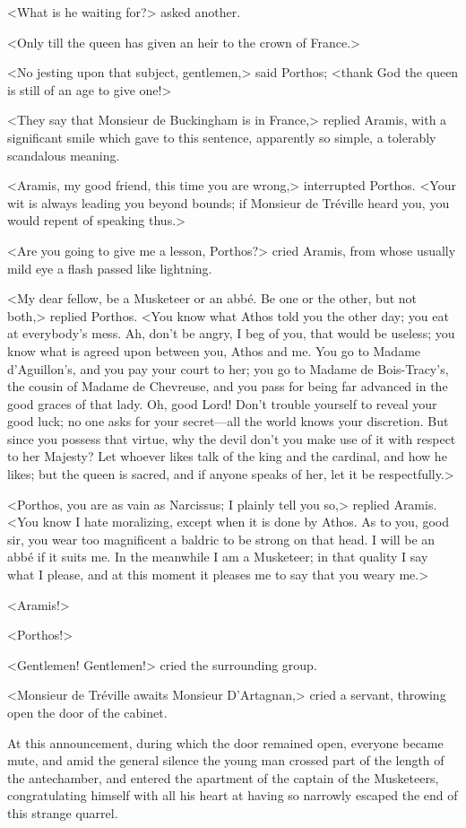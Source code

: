 <What is he waiting for?> asked another. 

<Only till the queen has given an heir to the crown of France.> 

<No jesting upon that subject, gentlemen,> said Porthos; <thank God the queen is still of an age to give one!> 

<They say that Monsieur de Buckingham is in France,> replied Aramis, with a significant smile which gave to this sentence, apparently so simple, a tolerably scandalous meaning. 

<Aramis, my good friend, this time you are wrong,> interrupted Porthos. <Your wit is always leading you beyond bounds; if Monsieur de Tréville heard you, you would repent of speaking thus.> 

<Are you going to give me a lesson, Porthos?> cried Aramis, from whose usually mild eye a flash passed like lightning. 

<My dear fellow, be a Musketeer or an abbé. Be one or the other, but not both,> replied Porthos. <You know what Athos told you the other day; you eat at everybody's mess. Ah, don't be angry, I beg of you, that would be useless; you know what is agreed upon between you, Athos and me. You go to Madame d'Aguillon's, and you pay your court to her; you go to Madame de Bois-Tracy's, the cousin of Madame de Chevreuse, and you pass for being far advanced in the good graces of that lady. Oh, good Lord! Don't trouble yourself to reveal your good luck; no one asks for your secret—all the world knows your discretion. But since you possess that virtue, why the devil don't you make use of it with respect to her Majesty? Let whoever likes talk of the king and the cardinal, and how he likes; but the queen is sacred, and if anyone speaks of her, let it be respectfully.> 

<Porthos, you are as vain as Narcissus; I plainly tell you so,> replied Aramis. <You know I hate moralizing, except when it is done by Athos. As to you, good sir, you wear too magnificent a baldric to be strong on that head. I will be an abbé if it suits me. In the meanwhile I am a Musketeer; in that quality I say what I please, and at this moment it pleases me to say that you weary me.> 

<Aramis!> 

<Porthos!> 

<Gentlemen! Gentlemen!> cried the surrounding group. 

<Monsieur de Tréville awaits Monsieur D'Artagnan,> cried a servant, throwing open the door of the cabinet. 

At this announcement, during which the door remained open, everyone became mute, and amid the general silence the young man crossed part of the length of the antechamber, and entered the apartment of the captain of the Musketeers, congratulating himself with all his heart at having so narrowly escaped the end of this strange quarrel.
